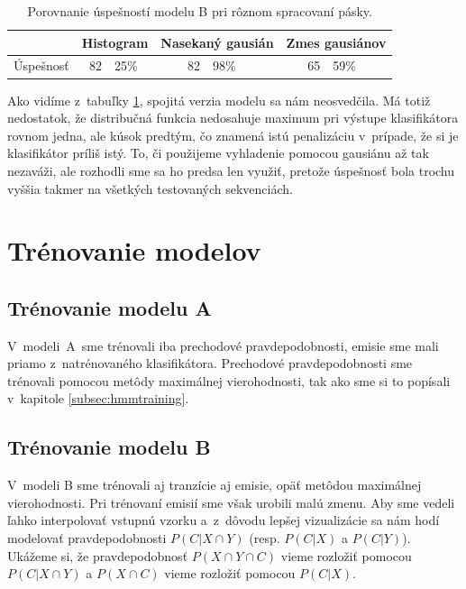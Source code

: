 \begin{table}[htp]
\centering
\begin{tabular}{c|r@{,}lr@{,}lr@{,}l}
& \multicolumn{2}{c}{Histogram}  & \multicolumn{2}{c}{Nasekaný gausián} & \multicolumn{2}{c}{Zmes gausiánov}\\
\hline
Úspešnosť & 82 & 25\% & 82 & 98\% & 65 & 59\%\\
\end{tabular}
\vspace{0.5cm}
\caption[Porovnanie úspešností pri rôznom spracovaní pásky]{Porovnanie úspešností modelu B pri rôznom spracovaní pásky.}
\label{tab:success-b-tape}
\end{table}

Ako vidíme z~tabuľky \ref{tab:success-b-tape}, spojitá verzia modelu sa nám neosvedčila. Má totiž nedostatok, že distribučná funkcia nedosahuje maximum pri výstupe klasifikátora rovnom jedna, ale kúsok predtým, čo znamená istú penalizáciu v~prípade, že si je klasifikátor príliš istý. To, či použijeme vyhladenie pomocou gausiánu až tak nezaváži, ale rozhodli sme sa ho predsa len využiť, pretože úspešnosť bola trochu vyššia takmer na všetkých testovaných sekvenciách.

\section{Trénovanie modelov}

\subsection{Trénovanie modelu A}

V~modeli~A~sme trénovali iba prechodové pravdepodobnosti, emisie sme mali priamo z~natrénovaného klasifikátora. Prechodové pravdepodobnosti sme trénovali pomocou metôdy maximálnej vierohodnosti, tak ako sme si to popísali v~kapitole \ref{subsec:hmmtraining}.

\subsection{Trénovanie modelu B}

V~modeli B sme trénovali aj tranzície aj emisie, opäť metôdou maximálnej vierohodnosti. Pri trénovaní emisií sme však urobili malú zmenu. Aby sme vedeli ľahko interpolovať vstupnú vzorku a~z~dôvodu lepšej vizualizácie sa nám hodí modelovať pravdepodobnosti $P(C|X \cap Y)$ (resp. $P(C|X)$ a $P(C|Y)$). Ukážeme si, že pravdepodobnosť $P(X \cap Y \cap C)$ vieme rozložiť pomocou $P(C|X \cap Y)$ a $P(X \cap C)$ vieme rozložiť pomocou $P(C|X)$.

